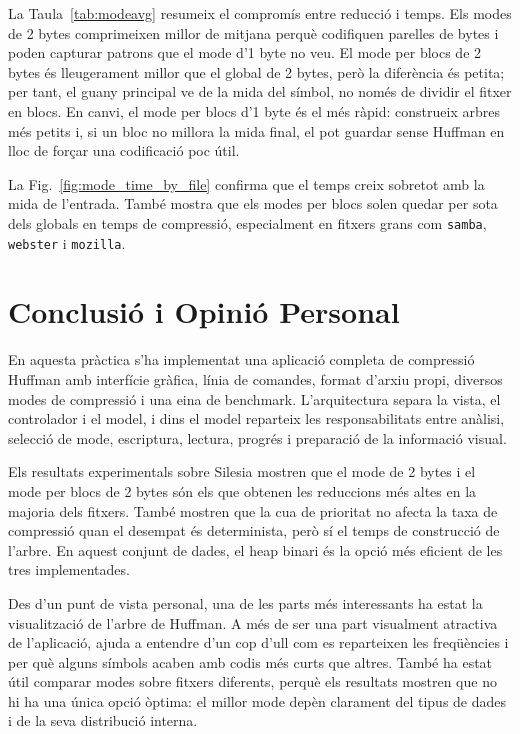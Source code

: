 \documentclass[conference,compsoc]{IEEEtran}
\begin{document}
La Taula~\ref{tab:modeavg} resumeix el compromís entre reducció i temps. Els
modes de 2 bytes comprimeixen millor de mitjana perquè codifiquen parelles de
bytes i poden capturar patrons que el mode d'1 byte no veu. El mode per blocs
de 2 bytes és lleugerament millor que el global de 2 bytes, però la diferència
és petita; per tant, el guany principal ve de la mida del símbol, no només de
dividir el fitxer en blocs. En canvi, el mode per blocs d'1 byte és el més
ràpid: construeix arbres més petits i, si un bloc no millora la mida final,
el pot guardar sense Huffman en lloc de forçar una codificació poc útil.

La Fig.~\ref{fig:mode_time_by_file} confirma que el temps creix sobretot amb
la mida de l'entrada. També mostra que els modes per blocs solen quedar per
sota dels globals en temps de compressió, especialment en fitxers grans com
\texttt{samba}, \texttt{webster} i \texttt{mozilla}.

\section{Conclusió i Opinió Personal}

En aquesta pràctica s'ha implementat una aplicació completa de compressió
Huffman amb interfície gràfica, línia de comandes, format d'arxiu propi,
diversos modes de compressió i una eina de benchmark. L'arquitectura separa
la vista, el controlador i el model, i dins el model reparteix les
responsabilitats entre anàlisi, selecció de mode, escriptura, lectura,
progrés i preparació de la informació visual.

Els resultats experimentals sobre Silesia mostren que el mode de 2 bytes i
el mode per blocs de 2 bytes són els que obtenen les reduccions més altes en
la majoria dels fitxers. També mostren que la cua de prioritat no afecta la
taxa de compressió quan el desempat és determinista, però sí el temps de
construcció de l'arbre. En aquest conjunt de dades, el heap binari és la
opció més eficient de les tres implementades.

Des d'un punt de vista personal, una de les parts més interessants ha estat
la visualització de l'arbre de Huffman. A més de ser una part visualment
atractiva de l'aplicació, ajuda a entendre d'un cop d'ull com es reparteixen
les freqüències i per què alguns símbols acaben amb codis més curts que
altres. També ha estat útil comparar modes sobre fitxers diferents, perquè
els resultats mostren que no hi ha una única opció òptima: el millor mode
depèn clarament del tipus de dades i de la seva distribució interna.
\end{document}
